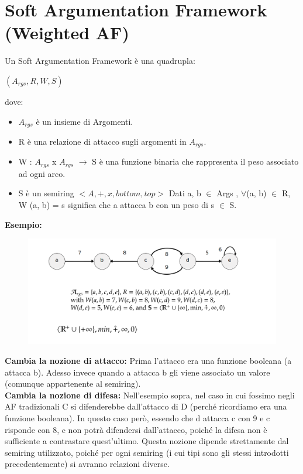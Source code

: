 \section{Soft Argumentation Framework (Weighted AF)}
Un Soft Argumentation Framework è una quadrupla:
\begin{center}
    $(A_{rgs} , R, W, S)$
\end{center}
dove:
\begin{itemize}
    \item $A_{rgs}$ è un insieme di Argomenti.
    \item R è una relazione di attacco sugli argomenti in $A_{rgs}$.
    \item W : $A_{rgs}$ x $A_{rgs}$ $\rightarrow$ S è una funzione binaria che rappresenta il peso associato ad ogni arco.
    \item S è un semiring $< A, +, x, bottom, top >$ Dati a, b $\in$ Args , $\forall$(a, b) $\in$ R, W (a, b) = s significa che a attacca b con un peso di s $\in$ S.
\end{itemize}
\newpage
\textbf{ Esempio:}
\begin{figure}[H]
    \centering
    \includegraphics[width=14cm, keepaspectratio]{img/Cap6/SoftA2.png}
\end{figure}

\textbf{Cambia la nozione di attacco:} Prima l'attacco era una funzione booleana (a attacca b). Adesso invece quando a attacca b gli viene associato un valore (comunque appartenente al semiring).
\\\textbf{Cambia la nozione di difesa:} Nell'esempio sopra, nel caso in cui fossimo negli AF tradizionali C si difenderebbe dall'attacco di D (perché ricordiamo era una funzione booleana). In questo caso però, essendo che d attacca c con 9 e c risponde con 8, c non potrà difendersi dall'attacco, poiché la difesa non è sufficiente a contrastare quest'ultimo. Questa nozione dipende strettamente dal semiring utilizzato, poiché per ogni semiring (i cui tipi sono gli stessi introdotti precedentemente) si avranno relazioni diverse.
